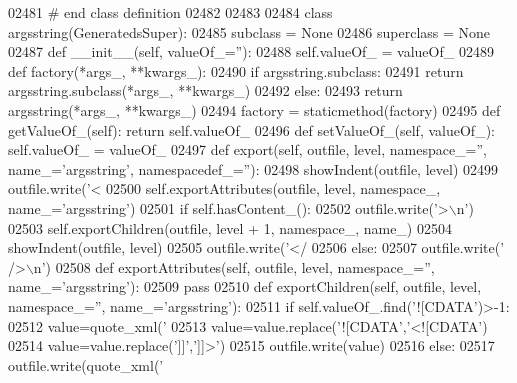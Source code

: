 \begin{DoxyCode}
{{{{{{{{{{{{{{{{{{{{{{{{{{{{{{{{{{{{{{{{{{{{{{{{{{{{{{{{{{{{{{{{{{{{{{{{{{{{{{{{{{{{{{{{{{{{{{{{{{{{{{{{{{{{{{{{{{{{{{{{{{{{{{{{{{{{{{{{{{{{{{{{{{{{{{{{{{{{{{{{{{{{{{{{{{{{{{{02481 \textcolor{comment}{# end class definition}
02482 
02483 
02484 \textcolor{keyword}{class }argsstring(GeneratedsSuper):
02485     subclass = \textcolor{keywordtype}{None}
02486     superclass = \textcolor{keywordtype}{None}
02487     \textcolor{keyword}{def }__init__(self, valueOf\_=''):
02488         self.valueOf_ = valueOf\_
02489     \textcolor{keyword}{def }factory(*args\_, **kwargs\_):
02490         \textcolor{keywordflow}{if} argsstring.subclass:
02491             \textcolor{keywordflow}{return} argsstring.subclass(*args\_, **kwargs\_)
02492         \textcolor{keywordflow}{else}:
02493             \textcolor{keywordflow}{return} argsstring(*args\_, **kwargs\_)
02494     factory = staticmethod(factory)
02495     \textcolor{keyword}{def }getValueOf_(self): \textcolor{keywordflow}{return} self.valueOf\_
02496     \textcolor{keyword}{def }setValueOf_(self, valueOf\_): self.valueOf\_ = valueOf\_
02497     \textcolor{keyword}{def }export(self, outfile, level, namespace\_='', name\_='argsstring', namespacedef\_=''):
02498         showIndent(outfile, level)
02499         outfile.write(\textcolor{stringliteral}{'<%
02500         self.exportAttributes(outfile, level, namespace\_, name\_=\textcolor{stringliteral}{'argsstring'})
02501         \textcolor{keywordflow}{if} self.hasContent_():
02502             outfile.write(\textcolor{stringliteral}{'>\(\backslash\)n'})
02503             self.exportChildren(outfile, level + 1, namespace\_, name\_)
02504             showIndent(outfile, level)
02505             outfile.write(\textcolor{stringliteral}{'</%
02506         \textcolor{keywordflow}{else}:
02507             outfile.write(\textcolor{stringliteral}{' />\(\backslash\)n'})
02508     \textcolor{keyword}{def }exportAttributes(self, outfile, level, namespace\_='', name\_='argsstring'):
02509         \textcolor{keywordflow}{pass}
02510     \textcolor{keyword}{def }exportChildren(self, outfile, level, namespace\_='', name\_='argsstring'):
02511         \textcolor{keywordflow}{if} self.valueOf\_.find(\textcolor{stringliteral}{'![CDATA'})>-1:
02512             value=quote_xml(\textcolor{stringliteral}{'%
02513             value=value.replace(\textcolor{stringliteral}{'![CDATA'},\textcolor{stringliteral}{'<![CDATA'})
02514             value=value.replace(\textcolor{stringliteral}{']]'},\textcolor{stringliteral}{']]>'})
02515             outfile.write(value)
02516         \textcolor{keywordflow}{else}:
02517             outfile.write(quote_xml(\textcolor{stringliteral}{'%
}}}}}}}}}}}}}}}}}}}}}}}}}}}}}}}}}}}}}}}}}}}}}}}}}}}}}}}}}}}}}}}}}}}}}}}}}}}}}}}}}}}}}}}}}}}}}}}}}}}}}}}}}}}}}}}}}}}}}}}}}}}}}}}}}}}}}}}}}}}}}}}}}}}}}}}}}}}}}}}}}}}}}}}}}}}}}}}}}}}
\end{DoxyCode}
